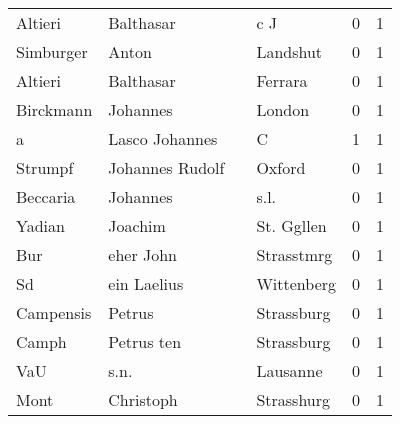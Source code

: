 \begin{center}
\begin{tiny}
\begin{longtabu}{llllrr}
                  Altieri &                          Balthasar &             &                                         c J &          0 &         1 \\
                Simburger &                              Anton &             &                                    Landshut &          0 &         1 \\
                  Altieri &                          Balthasar &             &                                     Ferrara &          0 &         1 \\
                Birckmann &                           Johannes &             &                                      London &          0 &         1 \\
                        a &                     Lasco Johannes &             &                                           C &          1 &         1 \\
                  Strumpf &                    Johannes Rudolf &             &                                      Oxford &          0 &         1 \\
                 Beccaria &                           Johannes &             &                                        s.l. &          0 &         1 \\
                   Yadian &                            Joachim &             &                                  St. Ggllen &          0 &         1 \\
                      Bur &                          eher John &             &                                  Strasstmrg &          0 &         1 \\
                       Sd &                        ein Laelius &             &                                  Wittenberg &          0 &         1 \\
                Campensis &                             Petrus &             &                                  Strassburg &          0 &         1 \\
                    Camph &                         Petrus ten &             &                                  Strassburg &          0 &         1 \\
                      VaU &                               s.n. &             &                                    Lausanne &          0 &         1 \\
                     Mont &                          Christoph &             &                                  Strasshurg &          0 &         1 \\

\end{longtabu}
\end{tiny}
\end{center}
